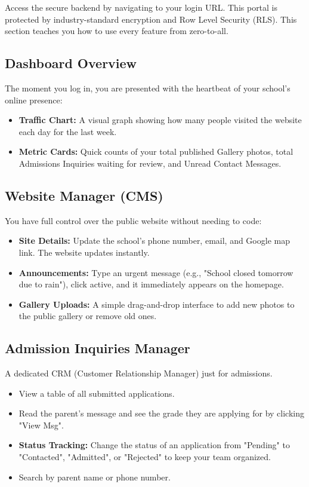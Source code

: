 \documentclass[11pt,a4paper]{article}
\begin{document}
Access the secure backend by navigating to your login URL. This portal is protected by industry-standard encryption and Row Level Security (RLS). This section teaches you how to use every feature from zero-to-all.

\subsection{Dashboard Overview}
The moment you log in, you are presented with the heartbeat of your school's online presence:
\begin{itemize}
    \item \textbf{Traffic Chart:} A visual graph showing how many people visited the website each day for the last week.
    \item \textbf{Metric Cards:} Quick counts of your total published Gallery photos, total Admissions Inquiries waiting for review, and Unread Contact Messages.
\end{itemize}

\subsection{Website Manager (CMS)}
You have full control over the public website without needing to code:
\begin{itemize}
    \item \textbf{Site Details:} Update the school's phone number, email, and Google map link. The website updates instantly.
    \item \textbf{Announcements:} Type an urgent message (e.g., "School closed tomorrow due to rain"), click active, and it immediately appears on the homepage.
    \item \textbf{Gallery Uploads:} A simple drag-and-drop interface to add new photos to the public gallery or remove old ones.
\end{itemize}

\subsection{Admission Inquiries Manager}
A dedicated CRM (Customer Relationship Manager) just for admissions. 
\begin{itemize}
    \item View a table of all submitted applications.
    \item Read the parent's message and see the grade they are applying for by clicking "View Msg".
    \item \textbf{Status Tracking:} Change the status of an application from "Pending" to "Contacted", "Admitted", or "Rejected" to keep your team organized.
    \item Search by parent name or phone number.
\end{itemize}
\end{document}
